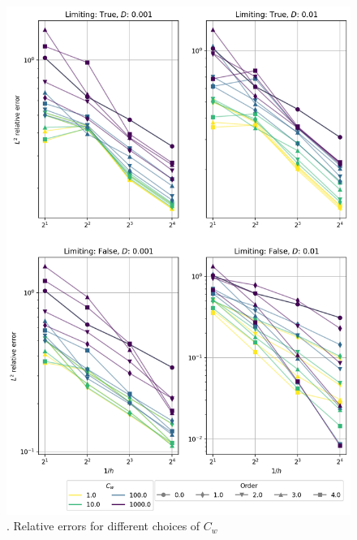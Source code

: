 %		
%		

\begin{figure}[p!]
	\centering
	\includegraphics[width=\textwidth]{../figs/parametric/burgers_1D/convergences}
	\caption{. Relative errors for different choices of $C_w$}
	\label{fig:burgers_conv}
\end{figure}
\clearpage

